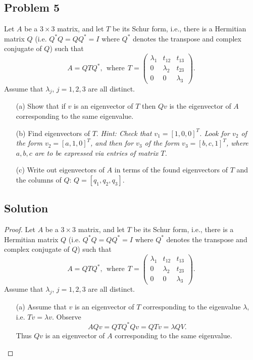 \documentclass[12pt]{report}
\begin{document}


\begin{problem}%
\subsection*{Problem 5}

Let $A$ be a $3\times3$ matrix, and let $T$ be its Schur form, i.e., there is a Hermitian matrix $Q$ (i.e. $Q^*Q = QQ^* = I$ where $Q^*$ denotes the transpose and complex conjugate of $Q$) such that
\[
     A = QTQ^*, ~~\text{where}~~ T = \begin{pmatrix}
        \lambda_1 & t_{12} & t_{13}\\ 0 & \lambda_2 & t_{23}\\ 0 & 0 & \lambda_3
     \end{pmatrix}.
\]
Assume that $\lambda_j$, $j=1,2,3$ are all distinct.
\begin{enumerate}
    \item [(a)] Show that if $v$ is an eigenvector of $T$ then $Qv$ is the eigenvector of $A$ corresponding to the same eigenvalue.
    \item [(b)] Find eigenvectors of $T$. \textit{Hint: Check that $v_1 = [1,0,0]^T$. Look for $v_2$ of the form $v_2 = [a,1,0]^T$, and then for $v_3$ of the form $v_3 = [b,c,1]^T$, where $a,b,c$ are to be expressed via entries of matrix $T$.}
    \item [(c)] Write out eigenvectors of $A$ in terms of the found eigenvectors of $T$ and the columns of $Q$: $Q = [q_1,q_2,q_3]$. 
\end{enumerate}

\subsection*{Solution}
\begin{proof}
Let $A$ be a $3\times3$ matrix, and let $T$ be its Schur form, i.e., there is a Hermitian matrix $Q$ (i.e. $Q^*Q = QQ^* = I$ where $Q^*$ denotes the transpose and complex conjugate of $Q$) such that
\[
     A = QTQ^*, ~~\text{where}~~ T = \begin{pmatrix}
          \lambda_1 & t_{12} & t_{13}\\ 0 & \lambda_2 & t_{23}\\ 0 & 0 & \lambda_3
     \end{pmatrix}.
\]
Assume that $\lambda_j$, $j=1,2,3$ are all distinct.
\begin{enumerate}
     \item [(a)]
     Assume that $v$ is an eigenvector of $T$ corresponding to the eigenvalue $\lambda$, i.e. $Tv = \lambda v$. Observe
     \[
           AQv = QTQ^*Qv = QTv = \lambda QV.
     \]
     Thus $Qv$ is an eigenvector of $A$ corresponding to the same eigenvalue.



\end{enumerate}
\end{proof}
\end{problem}
\end{document}
